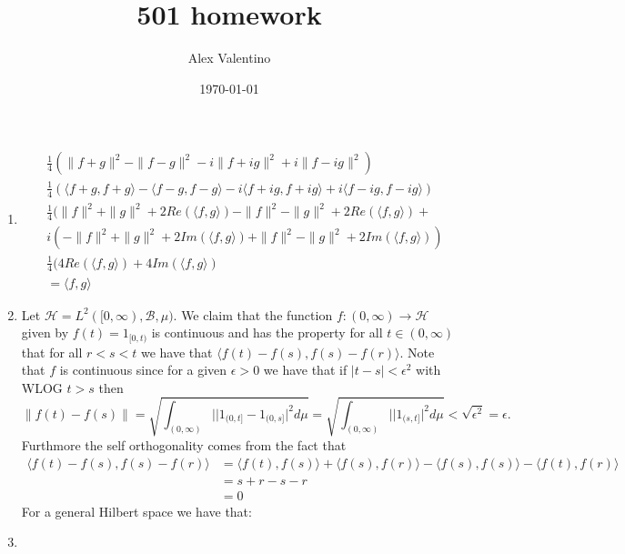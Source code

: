 \documentclass[12pt, letterpaper]{article}
\date{\today}
\author{Alex Valentino}
\title{501 homework}
\begin{document}
\begin{enumerate}
	\item[6]
	\begin{align*}
	&\frac{1}{4}(\|f+g\|^2 - \|f - g\|^2 - i \|f+ig\|^2 + i\|f-ig\|^2)\\
	&\frac{1}{4}(\langle f + g, f+ g\rangle - \langle f - g, f - g\rangle - i\langle f + ig, f + ig\rangle + i \langle f - ig, f - ig \rangle)\\
	&\frac{1}{4}(\|f\|^2 + \|g\|^2 + 2 Re(\langle f,g \rangle) - \|f\|^2 - \|g\|^2  + 2 Re(\langle f,g\rangle) +\\
	&i(-\|f\|^2 + \|g\|^2  + 2Im(\langle f,g\rangle) + \|f\|^2 - \|g\|^2 +  2Im(\langle f, g \rangle))\\
	& \frac{1}{4}(4Re(\langle f,g\rangle) + 4 Im (\langle f,g\rangle)\\
	&= \langle f,g\rangle
	\end{align*}
	\item[7] Let $\mathcal{H} = L^2([0,\infty), \mathcal{B}, \mu)$.  We claim that the function
	$f: (0,\infty) \to \mathcal{H}$ given by 
	$f(t) = 1_{[0,t)}$ is continuous and has 
	the property for all $t \in (0,\infty)$
	that for all $r < s < t$ we have that 
	$\langle f(t) - f(s), f(s) - f(r) \rangle$.  Note that $f$ is continuous since 
	for a given $\epsilon > 0$ we have that if $|t-s| < \epsilon^2$ with WLOG 
	$t > s$ then 
	$$
	\|f(t) - f(s)\| = \sqrt{\int_{(0,\infty)} | |1_{(0,t]} - 1_{(0,s]}|^2d\mu} =
	\sqrt{\int_{(0,\infty)} | |1_{(s,t]}|^2d\mu} <
	\sqrt{\epsilon^2} = \epsilon.
	$$
	Furthmore the self orthogonality comes from the fact that 
	\begin{align*}
		\langle f(t) - f(s), f(s) - f(r) \rangle &= \langle f(t), f(s) \rangle + 
		\langle f(s), f(r) \rangle - \langle f(s), f(s) \rangle - \langle f(t), f(r) \rangle \\
		&= s + r - s - r\\
		&= 0
	\end{align*}
	For a general Hilbert space we have that:
		\item[8]
		


\end{enumerate}
\end{document}
